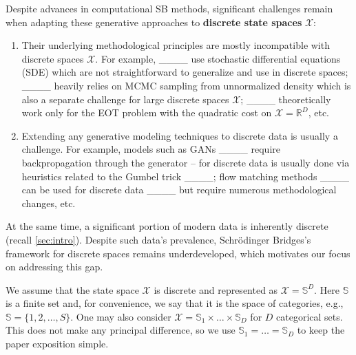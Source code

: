Despite advances in computational SB methods, significant challenges remain when adapting these generative approaches to \textbf{discrete state spaces} $\mathcal{X}$:
\begin{enumerate}[leftmargin=*]
    \item Their underlying methodological principles are mostly incompatible with discrete spaces $\mathcal{X}$. For example, ____ use stochastic differential equations (SDE) which are not straightforward to generalize and use in discrete spaces; ____ heavily relies on MCMC sampling from unnormalized density which is also a separate challenge for large discrete spaces $\mathcal{X}$; ____ theoretically work only for the EOT problem with the quadratic cost on $\mathcal{X}=\mathbb{R}^{D}$, etc. 
    \item Extending any generative modeling techniques to discrete data is usually a challenge. For example, models such as GANs ____ require backpropagation through the generator -- for discrete data is usually done via heuristics related to the Gumbel trick ____; flow matching methods ____ can be used for discrete data ____ but require numerous methodological changes, etc.
\end{enumerate}

At the same time, a significant portion of modern data is inherently discrete (recall \wasyparagraph\ref{sec:intro}). Despite such data's prevalence, Schrödinger Bridges's framework for discrete spaces remains underdeveloped, which motivates our focus on addressing this gap. 

We assume that the state space $\mathcal{X}$ is discrete and represented as $\mathcal{X}=\mathbb{S}^{D}$. Here $\mathbb{S}$ is a finite set and, for convenience, we say that it is the space of categories, e.g., $\mathbb{S}=\{1,2,\dots, S\}$. One may also consider $\mathcal{X}=\mathbb{S}_{1}\times \dots \times \mathbb{S}_{D}$ for $D$ categorical sets. This does not make any principal difference, so we use $\mathbb{S}_{1}=\dots=\mathbb{S}_{D}$ to keep the paper exposition simple.


